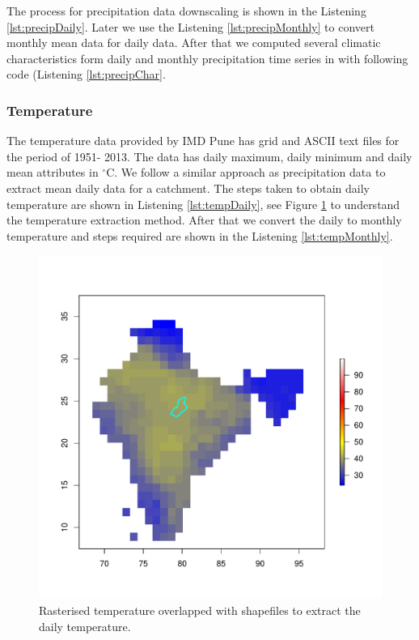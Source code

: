 \documentclass[a4paper, 12pt]{article}
\begin{document}
The process for precipitation data downscaling is shown in the Listening \ref{lst:precipDaily}. Later we use the Listening \ref{lst:precipMonthly} to convert monthly mean data for daily data. After that we computed several climatic characteristics form daily and monthly precipitation time series in with following code (Listening \ref{lst:precipChar}.

\subsubsection{Temperature}
The temperature data provided by IMD Pune has grid and ASCII text files for the period of 1951- 2013. The data has daily maximum, daily minimum and daily mean attributes in $^\circ$C. We follow a similar approach as precipitation data to extract mean daily data for a catchment. The steps taken to obtain daily temperature are shown in Listening \ref{lst:tempDaily}, see Figure \ref{fig:tempExt} to understand the temperature extraction method. After that we convert the daily to monthly temperature and steps required are shown in the Listening \ref{lst:tempMonthly}. 

\begin{figure}[!h]
\centering
\includegraphics[width = 1\textwidth]{Figures/TemperatureExt.pdf}
\caption{Rasterised temperature overlapped with shapefiles to extract the daily temperature.}
\label{fig:tempExt}
\end{figure}
\end{document}
